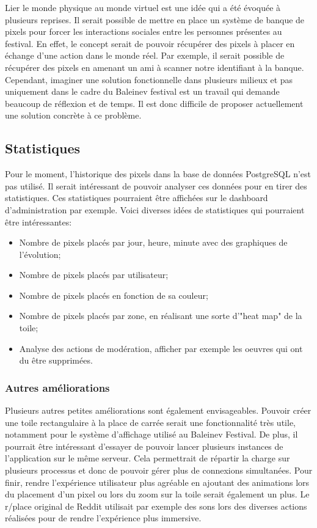 Lier le monde physique au monde virtuel est une idée qui a été évoquée à plusieurs reprises. Il serait possible de mettre en place un système de banque de pixels pour forcer les interactions sociales entre les personnes présentes au festival. En effet, le concept serait de pouvoir récupérer des pixels à placer en échange d'une action dans le monde réel. Par exemple, il serait possible de récupérer des pixels en amenant un ami à scanner notre identifiant à la banque. Cependant, imaginer une solution fonctionnelle dans plusieurs milieux et pas uniquement dans le cadre du Baleinev festival est un travail qui demande beaucoup de réflexion et de temps. Il est donc difficile de proposer actuellement une solution concrète à ce problème.

\subsection{Statistiques}

Pour le moment, l'historique des pixels dans la base de données PostgreSQL n'est pas utilisé. Il serait intéressant de pouvoir analyser ces données pour en tirer des statistiques. Ces statistiques pourraient être affichées sur le dashboard d'administration par exemple. Voici diverses idées de statistiques qui pourraient être intéressantes:

\begin{itemize}
  \item Nombre de pixels placés par jour, heure, minute avec des graphiques de l'évolution;
  \item Nombre de pixels placés par utilisateur;
  \item Nombre de pixels placés en fonction de sa couleur;
  \item Nombre de pixels placés par zone, en réalisant une sorte d'"heat map" de la toile;
  \item Analyse des actions de modération, afficher par exemple les oeuvres qui ont du être supprimées.
\end{itemize}

\subsubsection{Autres améliorations}

Plusieurs autres petites améliorations sont également envisageables. Pouvoir créer une toile rectangulaire à la place de carrée serait une fonctionnalité très utile, notamment pour le système d'affichage utilisé au Baleinev Festival. De plus, il pourrait être intéressant d'essayer de pouvoir lancer plusieurs instances de l'application sur le même serveur. Cela permettrait de répartir la charge sur plusieurs processus et donc de pouvoir gérer plus de connexions simultanées. Pour finir, rendre l'expérience utilisateur plus agréable en ajoutant des animations lors du placement d'un pixel ou lors du zoom sur la toile serait également un plus. Le r/place original de Reddit utilisait par exemple des sons lors des diverses actions réalisées pour de rendre l'expérience plus immersive.

\vfil
\hspace{8cm}\makeatletter\@author\makeatother\par
\hspace{8cm}\begin{minipage}{5cm}
  \printsignature
\end{minipage}
